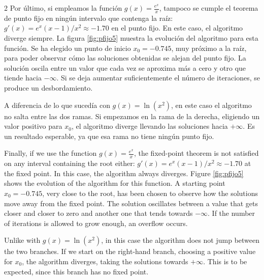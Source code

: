 \begin{paracol}{2}
	Por último, si empleamos la función $g(x)=\frac{e^x}{x}$, tampoco se cumple el teorema de punto fijo en ningún intervalo que contenga la raíz: $g'(x)=e^x(x-1)/x^2\approx-1.70$ en el punto fijo. En este caso, el algoritmo diverge siempre. La figura \ref{fig:pfijo5} muestra la evolución del algoritmo para esta función. Se ha elegido un punto de inicio $x_0=-0.745$, muy próximo a la raíz, para poder observar cómo las soluciones obtenidas se alejan del punto fijo. La solución oscila entre un valor que cada vez se aproxima más a cero y otro que tiende hacia $-\infty$. Si se deja aumentar suficientemente el número de iteraciones, se produce un desbordamiento.

	A diferencia de lo que sucedía con $g(x)=\ln(x^2)$, en este caso el algoritmo no salta entre las dos ramas. Si empezamos en la rama de la derecha, eligiendo un valor positivo para $x_0$, el algoritmo diverge llevando las soluciones hacia $+\infty$. Es un resultado esperable, ya que esa rama no tiene ningún punto fijo.

	\switchcolumn

	Finally, if we use the function $g(x)=\frac{e^x}{x}$, the fixed-point theorem is not satisfied on any interval containing the root either: $g'(x)=e^x(x-1)/x^2\approx-1.70$ at the fixed point. In this case, the algorithm always diverges. Figure \ref{fig:pfijo5} shows the evolution of the algorithm for this function. A starting point $x_0=-0.745$, very close to the root, has been chosen to observe how the solutions move away from the fixed point. The solution oscillates between a value that gets closer and closer to zero and another one that tends towards $-\infty$. If the number of iterations is allowed to grow enough, an overflow occurs.

	Unlike with $g(x)=\ln(x^2)$, in this case the algorithm does not jump between the two branches. If we start on the right-hand branch, choosing a positive value for $x_0$, the algorithm diverges, taking the solutions towards $+\infty$. This is to be expected, since this branch has no fixed point.

\end{paracol}

